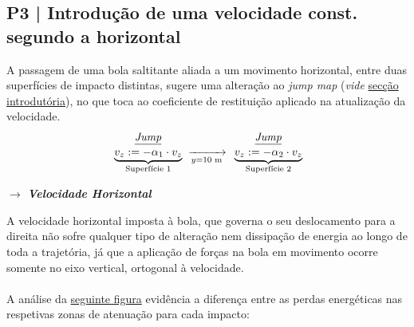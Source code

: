 \clearpage
\subsection{P3 | Introdução de uma velocidade const. segundo a horizontal}
\label{subsec:P3}

A passagem de uma bola saltitante aliada a um movimento horizontal, entre duas superfícies de impacto distintas, sugere uma alteração ao \textit{jump map} (\textit{vide} \hyperref[sec:intro]{secção introdutória}), no que toca ao coeficiente de restituição aplicado na atualização da velocidade.
$$ 
    \begin{aligned}
         &\mspace{36mu}\textit{\underline{Jump}}\\[-0.7ex]
         &\underbrace{v_z := -\alpha_1 \cdot v_z}_{\text{Superfície 1}}
    \end{aligned}
    \;\xrightarrow[y = 10\text{ m}]{}\;
    \begin{aligned}
         &\mspace{36mu}\textit{\underline{Jump}}\\[-0.7ex]
         &\underbrace{v_z := -\alpha_2 \cdot v_z}_{\text{Superfície 2}}
    \end{aligned}
$$

%

\vspace{1em}
\noindent $\pmb{\rightarrow}$ \textit{\textbf{Velocidade Horizontal}}

\noindent A velocidade horizontal imposta à bola, que governa o seu deslocamento para a direita não sofre qualquer tipo de alteração nem dissipação de energia ao longo de toda a trajetória, já que a aplicação de forças na bola em movimento ocorre somente no eixo vertical, ortogonal à velocidade.
\\\\
A análise da \hyperref[fig:2Pav]{seguinte figura} evidência a diferença entre as perdas energéticas nas respetivas zonas de atenuação para cada impacto:

